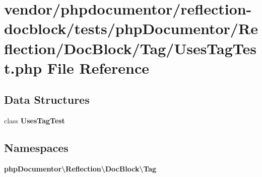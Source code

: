 \section{vendor/phpdocumentor/reflection-\/docblock/tests/php\+Documentor/\+Reflection/\+Doc\+Block/\+Tag/\+Uses\+Tag\+Test.php File Reference}
\label{_uses_tag_test_8php}
\subsection*{Data Structures}
\begin{DoxyCompactItemize}
\item 
class {\bf Uses\+Tag\+Test}
\end{DoxyCompactItemize}
\subsection*{Namespaces}
\begin{DoxyCompactItemize}
\item 
 {\bf php\+Documentor\textbackslash{}\+Reflection\textbackslash{}\+Doc\+Block\textbackslash{}\+Tag}
\end{DoxyCompactItemize}
